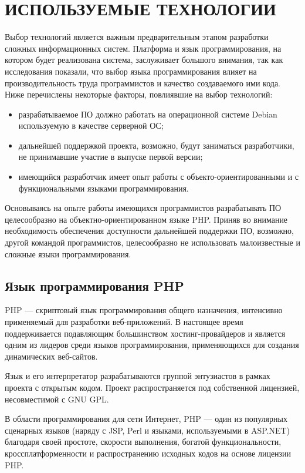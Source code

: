 \section{ИСПОЛЬЗУЕМЫЕ ТЕХНОЛОГИИ}

Выбор технологий является важным предварительным этапом разработки сложных информационных систем. Платформа и язык программирования, на котором будет реализована система, заслуживает большого внимания, так как исследования показали, что выбор языка программирования влияет на производительность труда программистов и качество создаваемого ими кода. Ниже перечислены некоторые факторы, повлиявшие на выбор технологий:
\begin{itemize}
    \item разрабатываемое ПО должно работать на операционной системе Debian используемую в качестве серверной ОС;
    \item дальнейшей поддержкой проекта, возможно, будут заниматься разработчики, не принимавшие участие в выпуске первой версии;
    \item имеющийся разработчик имеет опыт работы с объекто-ориентированными и с функциональными языками программирования.
\end{itemize}

Основываясь на опыте работы имеющихся программистов разрабатывать ПО целесообразно на объектно-ориентированном языке PHP. Приняв во внимание необходимость обеспечения доступности дальнейшей поддержки ПО, возможно, другой командой программистов, целесообразно не использовать малоизвестные и сложные языки программирования.

\subsection{Язык программирования PHP}

PHP — скриптовый язык программирования общего назначения, интенсивно применяемый для разработки веб-приложений. В настоящее время поддерживается подавляющим большинством хостинг-провайдеров и является одним из лидеров среди языков программирования, применяющихся для создания динамических веб-сайтов.

Язык и его интерпретатор разрабатываются группой энтузиастов в рамках проекта с открытым кодом. Проект распространяется под собственной лицензией, несовместимой с GNU GPL.

В области программирования для сети Интернет, PHP — один из популярных сценарных языков (наряду с JSP, Perl и языками, используемыми в ASP.NET) благодаря своей простоте, скорости выполнения, богатой функциональности, кроссплатформенности и распространению исходных кодов на основе лицензии PHP.

